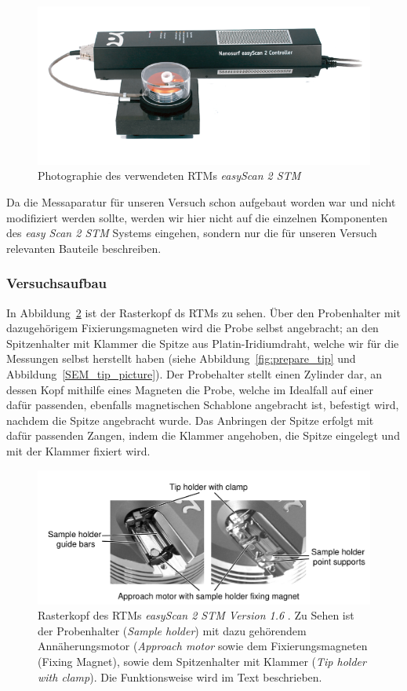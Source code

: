 \begin{figure}
\includegraphics[width=14cm]{pics/stm1}
\caption{Photographie des verwendeten RTMs \textit{easyScan 2
STM} \cite{easyscan2_STM}} 
 \label{fig:stm1}
\end{figure}

Da die Messaparatur für unseren Versuch schon aufgebaut worden
war und nicht modifiziert werden sollte, werden wir hier nicht
auf die einzelnen Komponenten des \textit{easy Scan 2 STM} Systems
eingehen, sondern nur die für unseren Versuch relevanten 
Bauteile beschreiben.
\subsubsection{Versuchsaufbau}
In Abbildung~\ref{fig:Rasterkopf} ist der Rasterkopf ds RTMs zu
sehen. Über den Probenhalter mit dazugehörigem Fixierungsmagneten
wird die Probe selbst angebracht; an den Spitzenhalter mit
Klammer die Spitze aus Platin-Iridiumdraht, 
welche wir für die Messungen selbst herstellt haben (siehe
Abbildung~\ref{fig:prepare_tip} und Abbildung~\ref{SEM_tip_picture}).
Der Probehalter stellt einen Zylinder dar, an dessen Kopf mithilfe
eines Magneten die Probe, welche im Idealfall auf einer dafür
passenden, ebenfalls magnetischen Schablone angebracht ist, 
befestigt wird, nachdem die Spitze angebracht wurde. 
Das Anbringen der Spitze erfolgt mit dafür passenden Zangen,
indem die Klammer angehoben, die Spitze eingelegt und mit
der Klammer fixiert wird.

\begin{figure}
\includegraphics[width=14cm]{pics/rasterkopf}
\caption{Rasterkopf des RTMs \textit{easyScan 2
STM Version 1.6} \cite{easyscan2_STM}.
Zu Sehen ist der Probenhalter (\textit{Sample holder}) mit dazu
gehörendem Annäherungsmotor (\textit{Approach motor} sowie
dem Fixierungsmagneten ({Fixing Magnet}), sowie dem Spitzenhalter
mit Klammer (\textit{Tip holder with clamp}). Die Funktionsweise
wird im Text beschrieben.}
 \label{fig:Rasterkopf}
\end{figure}


